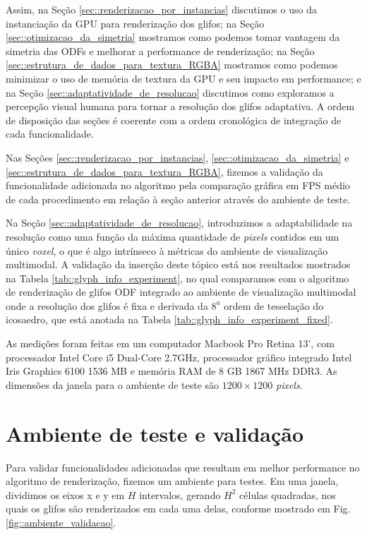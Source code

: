 \documentclass[
    12pt,                %
    oneside,            %
    a4paper,            %
    english,            %
    french,                %
    spanish,            %
    brazil                %
    ]{abntex2}
\begin{document}
Assim, na Seção \ref{sec::renderizacao_por_instancias} discutimos o uso da instanciação da GPU para renderização dos glifos; na Seção \ref{sec::otimizacao_da_simetria} mostramos como podemos tomar vantagem da simetria das ODFs e melhorar a performance de renderização; na Seção \ref{sec::estrutura_de_dados_para_textura_RGBA} mostramos como podemos minimizar o uso de memória de textura da GPU e seu impacto em performance; e na Seção \ref{sec::adaptatividade_de_resolucao} discutimos como exploramos a percepção visual humana para tornar a resolução dos glifos adaptativa. A ordem de disposição das seções é coerente com a ordem cronológica de integração de cada funcionalidade.

Nas Seções \ref{sec::renderizacao_por_instancias}, \ref{sec::otimizacao_da_simetria} e \ref{sec::estrutura_de_dados_para_textura_RGBA}, fizemos a validação da funcionalidade adicionada no algoritmo pela comparação gráfica em FPS médio de cada procedimento em relação à seção anterior através do ambiente de teste.%

Na Seção \ref{sec::adaptatividade_de_resolucao}, introduzimos a adaptabilidade na resolução como uma função da máxima quantidade de \textit{pixels} contidos em um único \textit{voxel}, o que é algo intrínseco à métricas do ambiente de visualização multimodal. A validação da inserção deste tópico está nos resultados mostrados na Tabela \ref{tab::glyph_info_experiment}, no qual comparamos com o algoritmo de renderização de glifos ODF integrado ao ambiente de visualização multimodal onde a resolução dos glifos é fixa e derivada da $8^a$ ordem de tesselação do icosaedro, que está anotada na Tabela \ref{tab::glyph_info_experiment_fixed}.

As medições foram feitas em um computador Macbook Pro Retina 13', com processador Intel Core i5 Dual-Core 2.7GHz, processador gráfico integrado Intel Iris Graphics 6100 1536 MB e memória RAM de 8 GB 1867 MHz DDR3. As dimensões da janela para o ambiente de teste são $1200 \times 1200$ \textit{pixels}.



\section{Ambiente de teste e validação}
\label{sec::ambiente_teste}

Para validar funcionalidades adicionadas que resultam em melhor performance no algoritmo de renderização, fizemos um ambiente para testes. Em uma janela, dividimos os eixos x e y em $H$ intervalos, gerando $H^2$ células quadradas, nos quais os glifos são renderizados em cada uma delas, conforme mostrado em Fig. \ref{fig::ambiente_validacao}.
\end{document}
